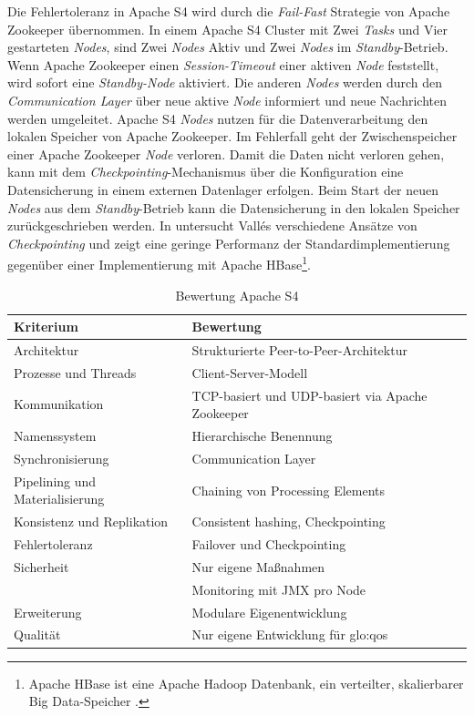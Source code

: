 Die Fehlertoleranz in Apache S4 wird durch die \textit{Fail-Fast} Strategie von Apache Zookeeper übernommen. In einem Apache S4 Cluster mit Zwei \textit{Tasks} und Vier gestarteten \textit{Nodes}, sind Zwei \textit{Nodes} Aktiv und Zwei \textit{Nodes} im \textit{Standby}-Betrieb. Wenn Apache Zookeeper einen \textit{Session-Timeout} einer aktiven \textit{Node} feststellt, wird sofort eine \textit{Standby-Node} aktiviert. Die anderen \textit{Nodes} werden durch den \textit{Communication Layer} über neue aktive \textit{Node} informiert und neue Nachrichten werden umgeleitet. Apache S4 \textit{Nodes} nutzen für die Datenverarbeitung den lokalen Speicher von Apache Zookeeper. Im Fehlerfall geht der Zwischenspeicher einer Apache Zookeeper \textit{Node} verloren. Damit die Daten nicht verloren gehen, kann mit dem \textit{Checkpointing}-Mechanismus über die Konfiguration eine Datensicherung in einem externen Datenlager erfolgen. Beim Start der neuen \textit{Nodes} aus dem \textit{Standby}-Betrieb kann die Datensicherung in den lokalen Speicher zurückgeschrieben werden. In  untersucht Vall{\'e}s verschiedene Ansätze von \textit{Checkpointing} und zeigt eine geringe Performanz der Standardimplementierung gegenüber einer Implementierung mit Apache HBase\footnote{Apache HBase ist eine Apache Hadoop Datenbank, ein verteilter, skalierbarer Big Data-Speicher .}. 

\begin{table}[!ht]
	\centering
		\begin{tabular}{@{}ll@{}} \toprule
			\textbf{Kriterium} & \textbf{Bewertung} \\ \midrule
			Architektur & Strukturierte Peer-to-Peer-Architektur \\
			Prozesse und Threads & Client-Server-Modell \\
			Kommunikation & TCP-basiert und UDP-basiert via Apache Zookeeper \\
			Namenssystem & Hierarchische Benennung \\
			Synchronisierung & Communication Layer \\
			Pipelining und Materialisierung & Chaining von Processing Elements  \\
			Konsistenz und Replikation & Consistent hashing, Checkpointing \\
			Fehlertoleranz & Failover und Checkpointing \\ 
			Sicherheit & Nur eigene Maßnahmen \\
			& Monitoring mit JMX pro Node \\
			Erweiterung & Modulare Eigenentwicklung \\
			Qualität & Nur eigene Entwicklung für \gls{glo:qos}  \\
			\bottomrule			
		\end{tabular}
	\caption{Bewertung Apache S4}
	\label{tab:bews4}
\end{table}

